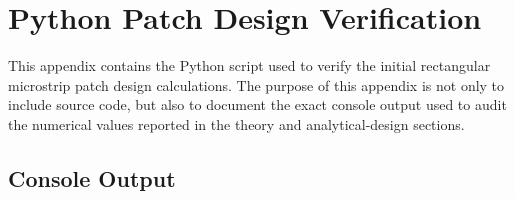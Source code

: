 \chapter{Python Patch Design Verification}
\label{app:patch-design-verification}

This appendix contains the Python script used to verify the initial rectangular microstrip patch design
calculations. The purpose of this appendix is not only to include source code, but also to document the
exact console output used to audit the numerical values reported in the theory and analytical-design
sections.



\section{Console Output}
\label{appsec:patch-design-console-output}


